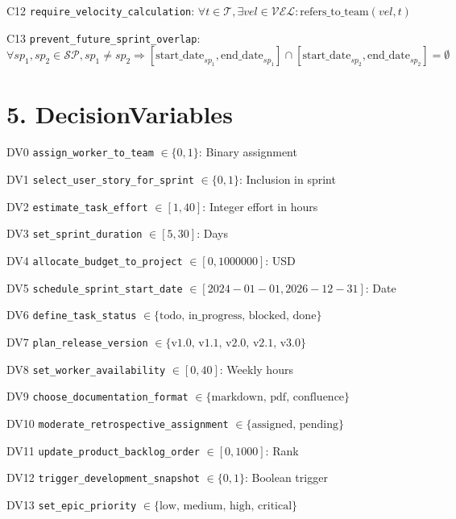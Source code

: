 \documentclass[12pt]{article}
\begin{document}
    \item[C12] \texttt{require\_velocity\_calculation}: 
    $\forall t \in \mathcal{T}, \exists vel \in \mathcal{VEL}: \text{refers\_to\_team}(vel, t)$
    
    \item[C13] \texttt{prevent\_future\_sprint\_overlap}: 
    $\forall sp_1, sp_2 \in \mathcal{SP}, sp_1 \neq sp_2 \Rightarrow [\text{start\_date}_{sp_1}, \text{end\_date}_{sp_1}] \cap [\text{start\_date}_{sp_2}, \text{end\_date}_{sp_2}] = \emptyset$

\section{5. DecisionVariables}
\item[DV0] \texttt{assign\_worker\_to\_team} $\in \{0,1\}$: Binary assignment
    \item[DV1] \texttt{select\_user\_story\_for\_sprint} $\in \{0,1\}$: Inclusion in sprint
    \item[DV2] \texttt{estimate\_task\_effort} $\in [1,40]$: Integer effort in hours
    \item[DV3] \texttt{set\_sprint\_duration} $\in [5,30]$: Days
    \item[DV4] \texttt{allocate\_budget\_to\_project} $\in [0, 1000000]$: USD
    \item[DV5] \texttt{schedule\_sprint\_start\_date} $\in [2024-01-01, 2026-12-31]$: Date
    \item[DV6] \texttt{define\_task\_status} $\in \{\text{todo, in\_progress, blocked, done}\}$
    \item[DV7] \texttt{plan\_release\_version} $\in \{\text{v1.0, v1.1, v2.0, v2.1, v3.0}\}$
    \item[DV8] \texttt{set\_worker\_availability} $\in [0,40]$: Weekly hours
    \item[DV9] \texttt{choose\_documentation\_format} $\in \{\text{markdown, pdf, confluence}\}$
    \item[DV10] \texttt{moderate\_retrospective\_assignment} $\in \{\text{assigned, pending}\}$
    \item[DV11] \texttt{update\_product\_backlog\_order} $\in [0,1000]$: Rank
    \item[DV12] \texttt{trigger\_development\_snapshot} $\in \{0,1\}$: Boolean trigger
    \item[DV13] \texttt{set\_epic\_priority} $\in \{\text{low, medium, high, critical}\}$
\end{document}
